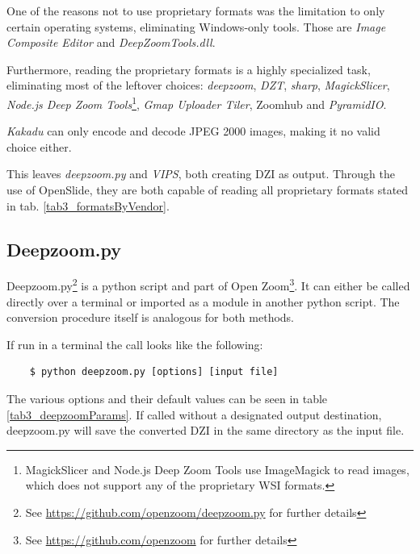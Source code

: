 One of the reasons not to use proprietary formats was the limitation to only certain operating systems, eliminating Windows-only tools. Those are \emph{Image Composite Editor} and \emph{DeepZoomTools.dll}.

Furthermore, reading the proprietary formats is a highly specialized task, eliminating most of the leftover choices: \emph{deepzoom}\cite{web:deepzoom}, \emph{DZT}\cite{web:dzt}, \emph{sharp}\cite{web:sharp}, \emph{MagickSlicer}, \emph{Node.js Deep Zoom Tools}\footnote{MagickSlicer and Node.js Deep Zoom Tools use ImageMagick to read images, which does not support any of the proprietary WSI formats\cite{web:imagemagick}.}, \emph{Gmap Uploader Tiler}\cite{web:gmap}, Zoomhub\cite{web:zoomhub} and \emph{PyramidIO}\cite{web:pyramidio}.

\emph{Kakadu} can only encode and decode JPEG 2000 images\cite{web:openseadragon}, making it no valid choice either.

This leaves \emph{deepzoom.py} and \emph{VIPS}, both creating DZI as output. Through the use of OpenSlide, they are both capable of reading all proprietary formats stated in tab. \ref{tab3_formatsByVendor}\cite{web:openslide}.


\subsection{Deepzoom.py}

Deepzoom.py\footnote{See \url{https://github.com/openzoom/deepzoom.py} for further details} is a python script and part of Open Zoom\footnote{See \url{https://github.com/openzoom} for further details}. It can either be called directly over a terminal or imported as a module in another python script. The conversion procedure itself is analogous for both methods.

If run in a terminal the call looks like the following:

\begin{lstlisting}
	$ python deepzoom.py [options] [input file]
\end{lstlisting}

The various options and their default values can be seen in table \ref{tab3_deepzoomParams}. If called without a designated output destination, deepzoom.py will save the converted DZI in the same directory as the input file.

